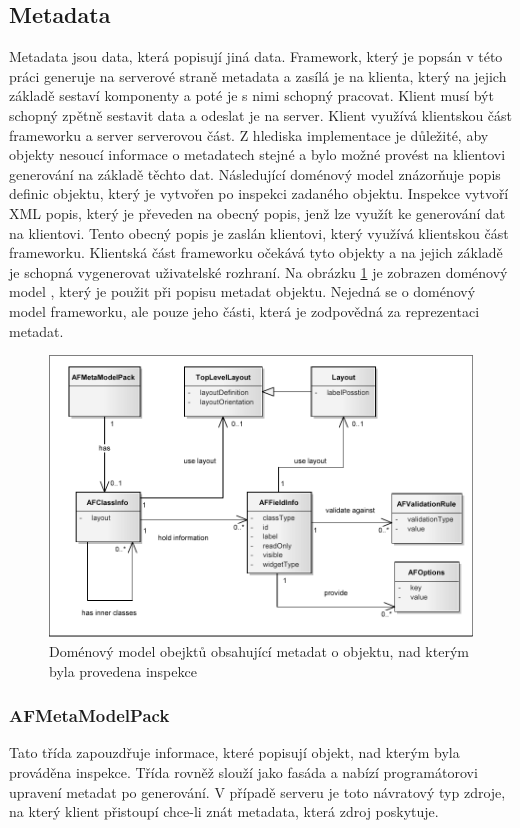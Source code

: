 \subsection{Metadata}
Metadata jsou data, která popisují jiná data. Framework, který je popsán v této práci generuje na serverové straně metadata a zasílá je na klienta, který na jejich základě sestaví komponenty a poté je s nimi schopný pracovat. Klient musí být schopný zpětně sestavit data a odeslat je na server. Klient využívá klientskou část frameworku a server serverovou část. Z hlediska implementace je důležité, aby objekty nesoucí informace o metadatech stejné a bylo možné provést na klientovi generování na základě těchto dat.
Následující doménový model znázorňuje popis definic objektu, který je vytvořen po inspekci zadaného objektu. Inspekce vytvoří XML popis, který je převeden na obecný popis, jenž lze využít ke generování dat na klientovi. Tento obecný popis je zaslán klientovi, který využívá klientskou část frameworku. Klientská část frameworku očekává tyto objekty a na jejich základě je schopná vygenerovat uživatelské rozhraní. Na obrázku \ref{img:metadataModel} je zobrazen doménový model \cite{UmlArlow}, který je použit při popisu metadat objektu. Nejedná se o doménový model frameworku, ale pouze jeho části, která je zodpovědná za reprezentaci metadat. 

\begin{figure}[h!]
\includegraphics{images/domainModel}
\caption{Doménový model obejktů obsahující metadat o objektu, nad kterým byla provedena inspekce}
\label{img:metadataModel}
\end{figure}

\subsubsection{AFMetaModelPack}
Tato třída zapouzdřuje informace, které popisují objekt, nad kterým byla prováděna inspekce. Třída rovněž slouží jako fasáda a nabízí programátorovi upravení metadat po generování. V případě serveru je toto návratový typ zdroje, na který klient přistoupí chce-li znát metadata, která zdroj poskytuje.
